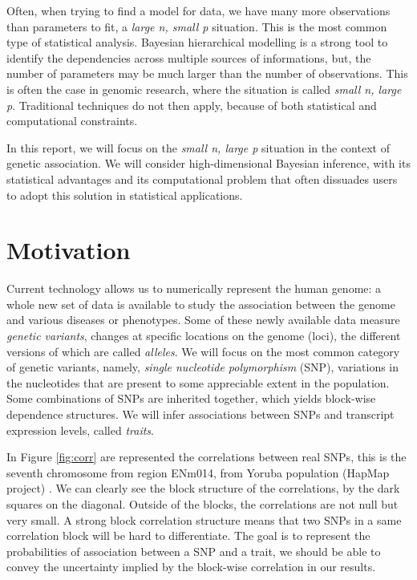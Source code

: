 \documentclass[a4paper, 11pt]{report}
\numberwithin{equation}{chapter}
\begin{document}
Often, when trying to find a model for data, we have many more observations than parameters to fit, a \textit{large n, small p} situation. This is the most common type of statistical analysis. Bayesian hierarchical modelling is a strong tool to identify the dependencies across multiple sources of informations, but, the number of parameters may be much larger than the number of observations. This is often the case in genomic research, where the situation is called \textit{small n, large p}. Traditional techniques do not then apply, because of both statistical and computational constraints.

In this report, we will focus on the \textit{small n, large p} situation in the context of genetic association. We will consider high-dimensional Bayesian inference, with its statistical advantages and its computational problem that often dissuades users to adopt this solution in statistical applications.

\section{Motivation}
Current technology allows us to numerically represent the human genome: a whole new set of data is available to study the association between the genome and various diseases or phenotypes.  Some of these newly available data measure \textit{genetic variants}, changes at specific locations on  the genome (loci), the different versions of which are called \textit{alleles}. We will focus on the most common category of genetic variants, namely, \textit{single nucleotide polymorphism} (SNP), variations in the nucleotides that are present to some appreciable extent in the population. Some combinations of SNPs are inherited together, which yields block-wise dependence structures. We will infer associations between SNPs and transcript expression levels, called \textit{traits}.

In Figure \ref{fig:corr} are represented the correlations between real SNPs, this is the seventh chromosome from region ENm014, from Yoruba population (HapMap project) \cite{hapmap}. We can clearly see the block structure of the correlations, by the dark squares on the diagonal. Outside of the blocks, the correlations are not null but very small. A strong block correlation structure means that two SNPs in a same correlation block will be hard to differentiate. The goal is to represent the probabilities of association between a SNP and a trait, we should be able to convey the uncertainty implied by the block-wise correlation in our results.
\end{document}
